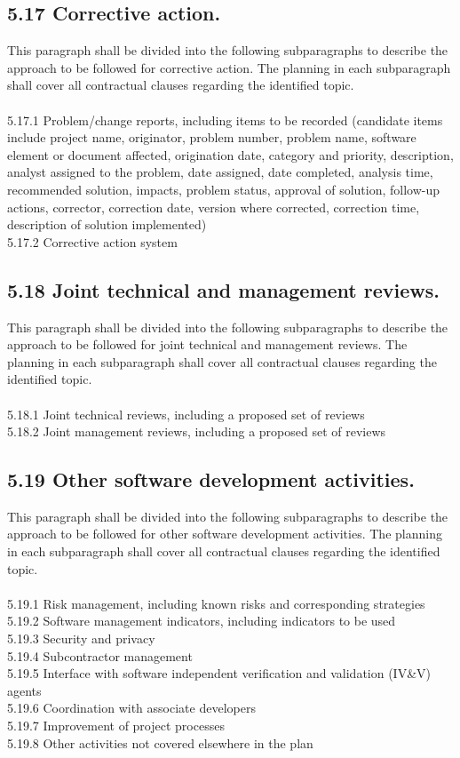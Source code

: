 \subsection{5.17 Corrective action.}

This paragraph shall be divided into the following subparagraphs to
describe the approach to be followed for corrective action. The planning
in each subparagraph shall cover all contractual clauses regarding the
identified topic. \\\\ 5.17.1 Problem/change reports, including items to
be recorded (candidate items include project name, originator, problem
number, problem name, software element or document affected, origination
date, category and priority, description, analyst assigned to the
problem, date assigned, date completed, analysis time, recommended
solution, impacts, problem status, approval of solution, follow-up
actions, corrector, correction date, version where corrected, correction
time, description of solution implemented) \\ 5.17.2 Corrective action
system

\subsection{5.18 Joint technical and management reviews.}

This paragraph shall be divided into the following subparagraphs to
describe the approach to be followed for joint technical and management
reviews. The planning in each subparagraph shall cover all contractual
clauses regarding the identified topic. \\\\ 5.18.1 Joint technical
reviews, including a proposed set of reviews \\ 5.18.2 Joint management
reviews, including a proposed set of reviews

\subsection{5.19 Other software development activities.}

This paragraph shall be divided into the following subparagraphs to
describe the approach to be followed for other software development
activities. The planning in each subparagraph shall cover all
contractual clauses regarding the identified topic. \\\\ 5.19.1 Risk
management, including known risks and corresponding strategies \\ 5.19.2
Software management indicators, including indicators to be used \\
5.19.3 Security and privacy \\ 5.19.4 Subcontractor management \\ 5.19.5
Interface with software independent verification and validation (IV\&V)
agents \\ 5.19.6 Coordination with associate developers \\ 5.19.7
Improvement of project processes \\ 5.19.8 Other activities not covered
elsewhere in the plan


